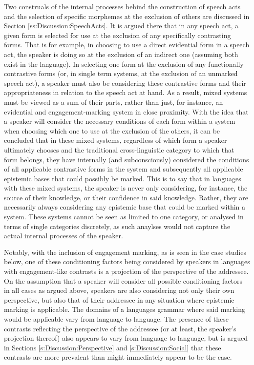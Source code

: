 Two construals of the internal processes behind the construction of speech acts and the selection of specific morphemes at the exclusion of others are discussed in Section \ref{ss:Discussion:SpeechActs}. It is argued there that in any speech act, a given form is selected for use at the exclusion of any specifically contrasting forms. That is for example, in choosing to use a direct evidential form in a speech act, the speaker is doing so at the exclusion of an indirect one (assuming both exist in the language). In selecting one form at the exclusion of any functionally contrastive forms (or, in single term systems, at the exclusion of an unmarked speech act), a speaker must also be considering these contrastive forms and their appropriateness in relation to the speech act at hand. As a result, mixed systems must be viewed as a sum of their parts, rather than just, for instance, an evidential and engagement-marking system in close proximity. With the idea that a speaker will consider the necessary conditions of each form within a system when choosing which one to use at the exclusion of the others, it can be concluded that in these mixed systems, regardless of which form a speaker ultimately chooses and the traditional cross-linguistic category to which that form belongs, they have internally (and subconsciously) considered the conditions of all applicable contrastive forms in the system and subsequently all applicable epistemic bases that could possibly be marked. This is to say that in languages with these mixed systems, the speaker is never only considering, for instance, the source of their knowledge, or their confidence in said knowledge. Rather, they are necessarily always considering any epistemic base that could be marked within a system. These systems cannot be seen as limited to one category, or analysed in terms of single categories discretely, as such anaylses would not capture the actual internal processes of the speaker.

Notably, with the inclusion of engagement marking, as is seen in the case studies below, one of these conditioning factors being considered by speakers in languages with engagement-like contrasts is a projection of the perspective of the addressee. On the assumption that a speaker will consider all possible conditioning factors in all cases as argued above, speakers are also considering not only their own perspective, but also that of their addressee in any situation where epistemic marking is applicable. The domains of a languages grammar where said marking would be applicable vary from language to language. The presence of these contrasts reflecting the perspective of the addressee (or at least, the speaker's projection thereof) also appears to vary from language to language, but is argued in Sections \ref{s:Discussion:Perspective} and \ref{s:Discussion:Social} that these contrasts are more prevalent than might immediately appear to be the case.

